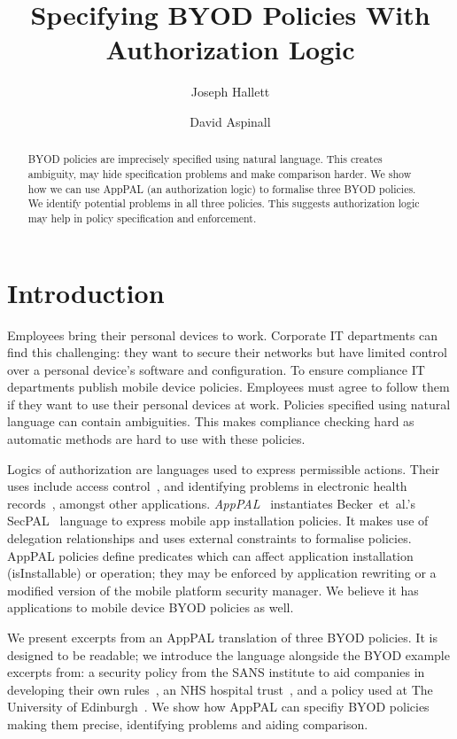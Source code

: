 \documentclass{easychair}
\title{Specifying BYOD Policies With Authorization Logic}
\author{
  Joseph Hallett%
  \and
  David Aspinall%
}
\institute{
  University of Edinburgh
}
\begin{document}
\maketitle

\begin{abstract}
  BYOD policies are imprecisely specified using natural language.
  This creates ambiguity, may hide specification problems and make comparison harder.
  We show how we can use AppPAL (an authorization logic) to formalise three BYOD policies.
  We identify potential problems in all three policies.
  This suggests authorization logic may help in policy specification and enforcement.
\end{abstract}

\section{Introduction}

Employees bring their personal devices to work.
Corporate IT departments can find this challenging:
  they want to secure their networks but have limited control over a personal device's software and configuration.
To ensure compliance IT departments publish mobile device policies.
Employees must agree to follow them if they want to use their personal devices at work.
Policies specified using natural language can contain ambiguities.
This makes compliance checking hard as automatic methods are hard to use with these policies.

Logics of authorization are languages used to express permissible actions.
Their uses include access control~\cite{Abadi:2003kta}, and identifying problems in electronic health records~\cite{Becker:2004fi}, amongst other applications.
\emph{AppPAL}~\cite{Hallett:2016vu} instantiates Becker~et~al{.}'s SecPAL~\cite{Becker:2006vh} language to express mobile app installation policies.
It makes use of delegation relationships and uses external constraints to formalise policies.
AppPAL policies define predicates which can affect application installation (isInstallable) or operation;
 they may be enforced by application rewriting or a modified version of the mobile platform security manager.
We believe it has applications to mobile device BYOD policies as well.

We present excerpts from an AppPAL translation of three BYOD policies. 
It is designed to be readable; we introduce the language alongside the BYOD example excerpts from:
    a security policy from the SANS institute to aid companies in developing their own rules~\cite{Guerin:2008we}, 
    an NHS hospital trust~\cite{Kennington:2014tr},
    and a policy used at The University of Edinburgh~\cite{Williamson:2015tr}.
We show how AppPAL can specifiy BYOD policies making them precise, identifying problems and aiding comparison.
\end{document}
